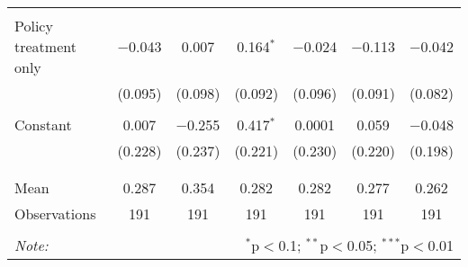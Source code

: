 \begin{tabular}{@{\extracolsep{5pt}}lcccccc}
  & & & & & & \\ 
 Policy treatment only & $-$0.043 & 0.007 & 0.164$^{*}$ & $-$0.024 & $-$0.113 & $-$0.042 \\ 
  & (0.095) & (0.098) & (0.092) & (0.096) & (0.091) & (0.082) \\ 
  & & & & & & \\ 
 Constant & 0.007 & $-$0.255 & 0.417$^{*}$ & 0.0001 & 0.059 & $-$0.048 \\ 
  & (0.228) & (0.237) & (0.221) & (0.230) & (0.220) & (0.198) \\ 
  & & & & & & \\ 
\hline \\[-1.8ex] 
Mean & 0.287 & 0.354 & 0.282 & 0.282 & 0.277 & 0.262 \\ 
Observations & 191 & 191 & 191 & 191 & 191 & 191 \\ 
\hline 
\hline \\[-1.8ex] 
\textit{Note:}  & \multicolumn{6}{r}{$^{*}$p$<$0.1; $^{**}$p$<$0.05; $^{***}$p$<$0.01} \\ 
\end{tabular} 

